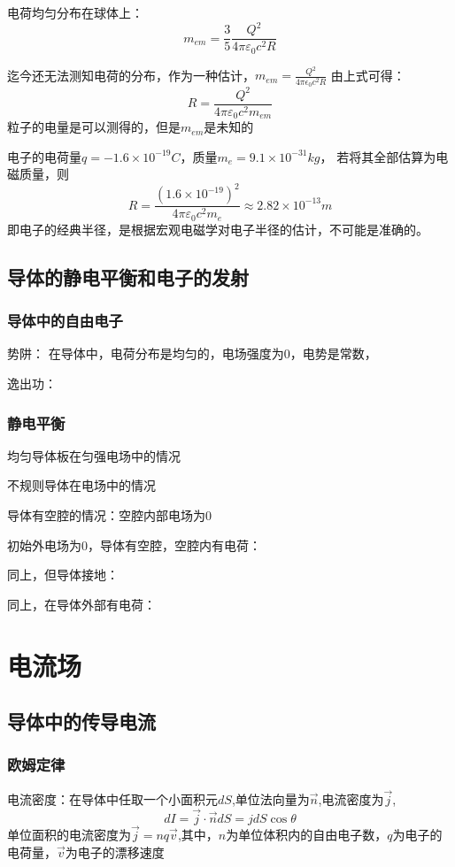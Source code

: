 \documentclass[11pt]{ctexart}
\begin{document}
电荷均匀分布在球体上：
\begin{equation}
    m_{em}=\frac{3}{5} \frac{Q^2}{4 \pi \varepsilon_0 c^2 R}
\end{equation}

迄今还无法测知电荷的分布，作为一种估计，$m_{em}=\frac{Q^2}{4 \pi \epsilon_0 c^2 R}
$
由上式可得：
\begin{equation}
    R=\frac{Q^2}{4 \pi \varepsilon_0 c^2 m_{em}}
\end{equation}
粒子的电量是可以测得的，但是$m_{em}$是未知的

电子的电荷量$q=-1.6 \times 10^{-19} C$，质量$m_e=9.1 \times 10^{-31} kg$，
若将其全部估算为电磁质量，则
\begin{equation}
    R=\frac{(1.6 \times 10^{-19})^2}{4 \pi \varepsilon_0 c^2 m_e} \approx 2.82 \times 10^{-13} m
\end{equation}
即电子的经典半径，是根据宏观电磁学对电子半径的估计，不可能是准确的。

\subsection{导体的静电平衡和电子的发射}
\subsubsection{导体中的自由电子}
势阱： 在导体中，电荷分布是均匀的，电场强度为0，电势是常数，

逸出功：

\subsubsection{静电平衡}
均匀导体板在匀强电场中的情况

不规则导体在电场中的情况

导体有空腔的情况：空腔内部电场为0

初始外电场为0，导体有空腔，空腔内有电荷：

同上，但导体接地：

同上，在导体外部有电荷：

\section{电流场}
\subsection{导体中的传导电流}
\subsubsection{欧姆定律}
电流密度：在导体中任取一个小面积元$dS$,单位法向量为$\vec{n}$,电流密度为$\vec{j}$,
\begin{equation}
    dI=\vec{j} \cdot \vec{n} dS
    =jdS \cos \theta
\end{equation}
单位面积的电流密度为$\vec{j}=nq\vec{v}$,其中，$n$为单位体积内的自由电子数，$q$为电子的电荷量，$\vec{v}$为电子的漂移速度
\end{document}
